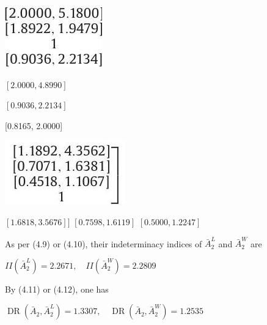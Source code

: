 \documentclass[10pt]{article}
\begin{document}
\begin{center}
\includegraphics[max width=\textwidth]{2024_01_11_2cd5b15325412bfb985dg-09(2)}
\end{center}

$[2.0000,4.8990]$

$[0.9036,2.2134]$

[0.8165, 2.0000]

\begin{center}
\includegraphics[max width=\textwidth]{2024_01_11_2cd5b15325412bfb985dg-09}
\end{center}

$[1.6818,3.5676]]$ $[0.7598,1.6119]$ $[0.5000,1.2247]$

As per (4.9) or (4.10), their indeterminacy indices of $\bar{A}_{2}^{L}$ and $\bar{A}_{2}^{W}$ are

$I I\left(\bar{A}_{2}^{L}\right)=2.2671, \quad I I\left(\bar{A}_{2}^{W}\right)=2.2809$

By (4.11) or (4.12), one has

$\operatorname{DR}\left(\bar{A}_{2}, \bar{A}_{2}^{L}\right)=1.3307, \quad \operatorname{DR}\left(\bar{A}_{2}, \bar{A}_{2}^{W}\right)=1.2535$
\end{document}
